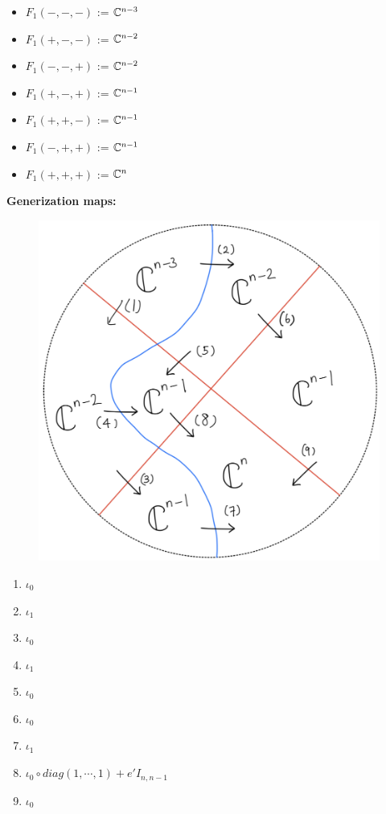 \begin{itemize}
\item $F_1(-,-,-)$ := $\mathbb{C}^{n-3}$
\item $F_1(+,-,-)$ := $\mathbb{C}^{n-2}$
\item $F_1(-,-,+)$ := $\mathbb{C}^{n-2}$
\item $F_1(+,-,+)$ := $\mathbb{C}^{n-1}$
\item $F_1(+,+,-)$ := $\mathbb{C}^{n-1}$
\item $F_1(-,+,+)$ := $\mathbb{C}^{n-1}$
\item $F_1(+,+,+)$ := $\mathbb{C}^n$
\end{itemize}
\textbf{Generization maps:}
\begin{figure}[H]
    \centering
    \includegraphics[scale = 0.95]{diagrams/cobord'4/33.png}
    \caption{}
    \label{fig:your-label}
\end{figure}
\begin{enumerate}[label = (\arabic*)]
\item $\iota_0$

\item $\iota_1$

\item $\iota_0$

\item $\iota_1$

\item $\iota_0$

\item $\iota_0$

\item $\iota_1$

\item $\iota_0 \circ diag(1,\cdots,1) + e' I_{n,n-1}$

\item $\iota_0$
\end{enumerate}

